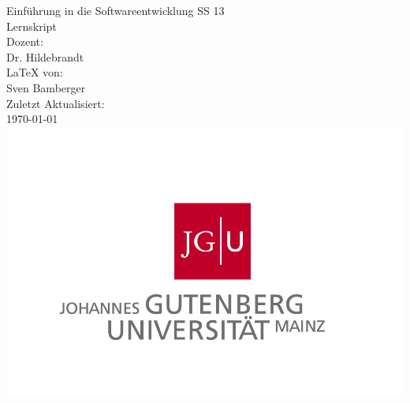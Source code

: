 \begin{titlepage}
\center
\Large Einführung in die Softwareentwicklung SS 13\large \\[2em]
Lernskript \\[2em]
Dozent:\\Dr. Hildebrandt\\[2em]
\LaTeX{} von:\\Sven Bamberger\\[2em]
Zuletzt Aktualisiert:\\\today\\
\includegraphics[scale=.2]{front/pics/Logo.jpg}\\\quad\\
\end{titlepage}
